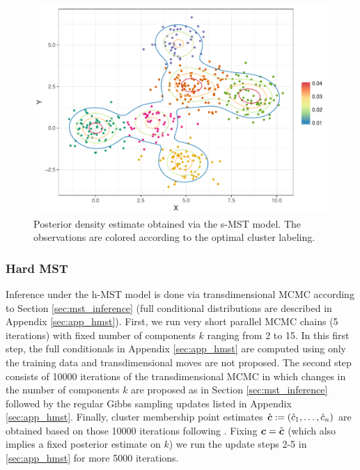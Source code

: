 \begin{figure}[!ht]
  \centering
    \includegraphics[scale = 0.4]{Img/Simulated/posterior_estimate}
\caption{Posterior density
  estimate obtained via the s-MST model. The observations are colored
  according to the optimal cluster labeling.}
\label{fig:sim1_dens}
\end{figure}


\subsubsection*{Hard MST}

Inference under the h-MST model is done via transdimensional MCMC according to Section \ref{sec:mst_inference} (full conditional distributions are described in Appendix \ref{sec:app_hmst}). First, we run very short parallel MCMC chains (5 iterations) with fixed number of components $k$ ranging from 2 to 15. In this first step, the full conditionals in Appendix \ref{sec:app_hmst} are computed using only the training data and transdimensional moves are not proposed. The second step consists of 10000 iterations of the transdimensional MCMC in which changes in the number of components $k$ are proposed as in Section \ref{sec:mst_inference} followed by the regular Gibbs sampling updates listed in Appendix \ref{sec:app_hmst}. Finally, cluster membership point estimates $\hat{\mbox{\boldmath $c$}}:=(\hat{c}_1, \ldots, \hat{c}_n)$ are obtained based on those 10000 iterations following \cite{wade2018bayesian}. Fixing $\mbox{\boldmath $c$} = \hat{\mbox{\boldmath $c$}}$  (which also implies a fixed posterior estimate on $k$) we run the update steps 2-5 in \ref{sec:app_hmst} for more 5000 iterations. 

